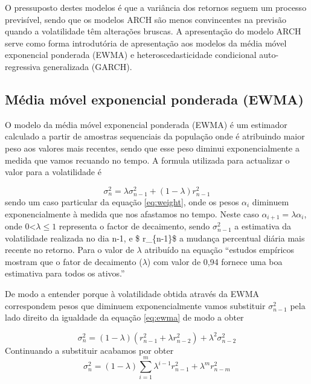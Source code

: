 \documentclass[
  12pt,
  a4paper,
  openany]{book}
\theoremstyle{definition}
\theoremstyle{definition}
\theoremstyle{definition}
\theoremstyle{remark}
\begin{document}
O pressuposto destes modelos é que a variância dos retornos seguem um processo previsível, sendo que os modelos ARCH são menos convincentes na previsão quando a volatilidade têm alterações bruscas. A apresentação do modelo ARCH serve como forma introdutória de apresentação aos modelos da média móvel exponencial ponderada (EWMA) e heteroscedasticidade condicional auto-regressiva generalizada (GARCH).

\hypertarget{muxe9dia-muxf3vel-exponencial-ponderada-ewma}{%
\subsection{Média móvel exponencial ponderada (EWMA)}\label{muxe9dia-muxf3vel-exponencial-ponderada-ewma}}

O modelo da média móvel exponencial ponderada (EWMA) é um estimador calculado a partir de amostras sequenciais da população onde é atribuindo maior peso aos valores mais recentes, sendo que esse peso diminui exponencialmente a medida que vamos recuando no tempo. A formula utilizada para actualizar o valor para a volatilidade é

\begin{equation} 
  \sigma_{n}^{2} = \lambda\sigma_{n-1}^{2}+(1-\lambda) r_{n-1}^{2} 
  \label{eq:ewma}
\end{equation}
sendo um caso particular da equação \eqref{eq:weight}, onde os pesos \(\alpha_{i}\) diminuem exponencialmente à medida que nos afastamos no tempo. Neste caso \(\alpha_{i+1} = \lambda\alpha_{i}\), onde 0\textless{}\(\lambda\leq1\) representa o factor de decaimento, sendo \(\sigma_{n-1}^{2}\) a estimativa da volatilidade realizada no dia n-1, e \$ r\_\{n-1\}\$ a mudança percentual diária mais recente no retorno. Para o valor de \(\lambda\) atribuído na equação ``estudos empíricos mostram que o fator de decaimento (\(\lambda\)) com valor de 0,94 fornece uma boa estimativa para todos os ativos.''\citep[p.4]{riskmetrics}

De modo a entender porque à volatilidade obtida através da EWMA correspondem pesos que diminuem exponencialmente vamos substituir \(\sigma_{n-1}^{2}\) pela lado direito da igualdade da equação \eqref{eq:ewma} de modo a obter

\begin{equation} 
  \sigma_{n}^{2} = (1-\lambda)(r_{n-1}^{2}+\lambda r_{n-2}^{2})+\lambda^{2}\sigma_{n-2}^{2}
  \label{eq:ewma1}
\end{equation}
Continuando a substituir acabamos por obter
\begin{equation} 
  \sigma_{n}^{2} = (1-\lambda)\sum_{i=1}^{m}\lambda^{i-1} r_{n-1}^{2}+\lambda^{m} r_{n-m}^{2}
  \label{eq:ewma2}
\end{equation}
\end{document}
